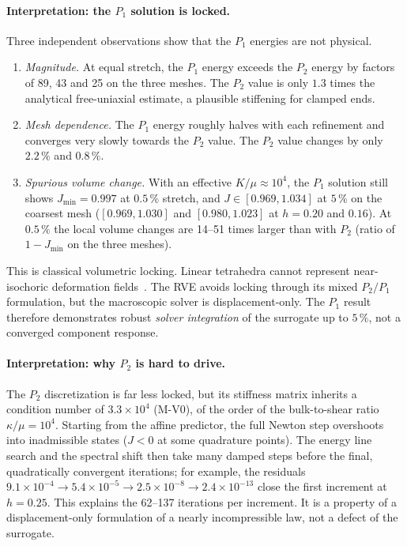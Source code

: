 \paragraph{Interpretation: the $P_1$ solution is locked.} Three independent
observations show that the $P_1$ energies are not physical.
\begin{enumerate}
  \item \emph{Magnitude.} At equal stretch, the $P_1$ energy exceeds the $P_2$ energy
        by factors of 89, 43 and 25 on the three meshes. The $P_2$ value is only
        $1.3$ times the analytical free-uniaxial estimate, a plausible stiffening
        for clamped ends.
  \item \emph{Mesh dependence.} The $P_1$ energy roughly halves with each refinement
        and converges very slowly towards the $P_2$ value. The $P_2$ value changes
        by only $2.2\,\%$ and $0.8\,\%$.
  \item \emph{Spurious volume change.} With an effective $K/\mu\approx10^4$, the
        $P_1$ solution still shows $J_{\min}=0.997$ at $0.5\,\%$ stretch, and
        $J\in[0.969,1.034]$ at $5\,\%$ on the coarsest mesh ($[0.969,1.030]$ and $[0.980,1.023]$ at $h=0.20$ and $0.16$). At $0.5\,\%$ the local volume changes are
        14--51 times larger than with $P_2$ (ratio of $1-J_{\min}$ on the three meshes).
\end{enumerate}
This is classical volumetric locking. Linear tetrahedra cannot represent
near-isochoric deformation fields~\cite{Simo1985,Zienkiewicz2013}. The RVE avoids
locking through its mixed $P_2/P_1$ formulation, but the macroscopic solver is
displacement-only. The $P_1$ result therefore demonstrates robust \emph{solver
integration} of the surrogate up to $5\,\%$, not a converged component response.

\paragraph{Interpretation: why $P_2$ is hard to drive.} The $P_2$ discretization is
far less locked, but its stiffness matrix inherits a condition number of
$3.3\times10^4$ (M-V0), of the order of the bulk-to-shear ratio $\kappa/\mu=10^4$. Starting from the affine predictor, the full
Newton step overshoots into inadmissible states ($J<0$ at some quadrature points).
The energy line search and the spectral shift then take many damped steps before
the final, quadratically convergent iterations; for example, the residuals
$9.1\times10^{-4}\to5.4\times10^{-5}\to2.5\times10^{-8}\to2.4\times10^{-13}$ close the
first increment at $h=0.25$. This explains the 62--137 iterations per increment. It
is a property of a displacement-only formulation of a nearly incompressible law,
not a defect of the surrogate.

